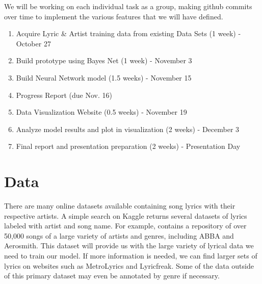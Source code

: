 \documentclass[11pt,a4paper]{article}
\begin{document}
We will be working on each individual task as a group, making github commits over time to implement the various features that we will have defined. 

\begin{enumerate}
    \item Acquire Lyric \& Artist training data from existing Data Sets  (1 week) - October 27
    \item Build prototype using Bayes Net (1 week) - November 3
    \item Build Neural Network model (1.5 weeks) - November 15
    \item Progress Report (due Nov. 16)
    \item Data Visualization Website (0.5 weeks) - November 19
    \item Analyze model results and plot in visualization (2 weeks) - December 3
    \item Final report and presentation preparation (2 weeks) - Presentation Day
\end{enumerate}

\section{Data}
There are many online datasets available containing song lyrics with their respective artists. A simple search on Kaggle returns several datasets of lyrics labeled with artist and song name. For example,  contains a repository of over 50,000 songs of a large variety of artists and genres, including ABBA and Aerosmith. This dataset will provide us with the large variety of lyrical data we need to train our model. If more information is needed, we can find larger sets of lyrics on websites such as MetroLyrics and Lyricfreak. Some of the data outside of this primary dataset may even be annotated by genre if necessary.
\end{document}
